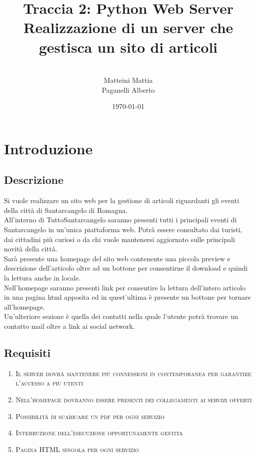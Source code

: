 \documentclass[a4paper,12pt]{report}
\title{\textbf{Traccia 2: Python Web Server}
Realizzazione di un server che gestisca un sito di articoli}
\author{
\\Matteini Mattia
\\Paganelli Alberto
}
\date{\today}
\begin{document}
\maketitle

\tableofcontents


\chapter{Introduzione}

\section{Descrizione}
Si vuole realizzare un sito web per la gestione di articoli riguardanti gli eventi della città di Santarcangelo di Romagna.
\\
All’interno di TuttoSantarcangelo saranno presenti tutti i principali eventi di Santarcangelo in un'unica piattaforma web. Potrà essere consultato dai turisti, dai cittadini più curiosi o da chi vuole mantenersi aggiornato sulle principali novità della città.
\\
Sarà presente una homepage del sito web contenente una piccola preview e descrizione dell’articolo oltre ad un bottone per consentirne il download e quindi la lettura anche in locale.
\\
Nell’homepage saranno presenti link per consentire la lettura dell’intero articolo in una pagina html apposita ed in quest’ultima è presente un bottone per tornare all’homepage.
\\
Un'ulteriore sezione è quella dei contatti nella quale l’utente potrà trovare un contatto mail oltre a link ai social network.

\clearpage

\section{Requisiti}

\begin{enumerate}
    \item \textsc{Il server dovrà mantenere più connessioni in contemporanea per garantire l'accesso a più utenti}
    \item \textsc{Nell’homepage dovranno essere presenti dei collegamenti ai servizi offerti}
    \item \textsc{Possibilità di scaricare un pdf per ogni servizio}
    \item \textsc{Interruzione dell'esecuzione opportunamente gestita}
    \item \textsc{Pagina HTML singola per ogni servizio}
\end{enumerate}
\end{document}
